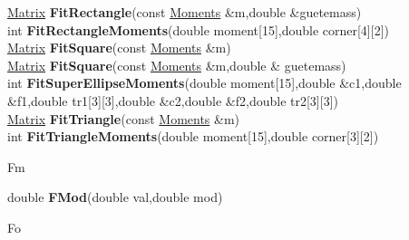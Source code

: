 \documentclass[10pt,titlepage]{article}
\def\functionlistentry#1#2#3#4#5#6{\noindent #1 {\bf #2}(#3) \dotfill #6\\}
\def\letterref#1{}
\def\letterlabel#1{\vspace{0.5cm}\centerline{\Large #1}}
\def\letterlabelend#1{}
\begin{document}
{{\functionlistentry{\hyperlink{Matrix}{Matrix}}{FitRectangle}{const \hyperlink{Moments}{Moments} \&m,double \&guetemass}{848}{moments}{}
\functionlistentry{int}{FitRectangleMoments}{double moment[15],double corner[4][2]}{1623}{obsolet}{}
\functionlistentry{\hyperlink{Matrix}{Matrix}}{FitSquare}{const \hyperlink{Moments}{Moments} \&m}{845}{moments}{}
\functionlistentry{\hyperlink{Matrix}{Matrix}}{FitSquare}{const \hyperlink{Moments}{Moments} \&m,double \& guetemass}{846}{moments}{}
\functionlistentry{int}{FitSuperEllipseMoments}{double moment[15],double \&c1,double \&f1,double tr1[3][3],double \&c2,double \&f2,double tr2[3][3]}{1631}{obsolet}{}
\functionlistentry{\hyperlink{Matrix}{Matrix}}{FitTriangle}{const \hyperlink{Moments}{Moments} \&m}{840}{moments}{}
\functionlistentry{int}{FitTriangleMoments}{double moment[15],double corner[3][2]}{1622}{obsolet}{}

\letterlabel{Fm}
\letterref{A}
\letterref{B}
\letterref{C}
\letterref{D}
\letterref{E}
\letterref{F}
\letterref{G}
\letterref{H}
\letterref{I}
\letterref{K}
\letterref{L}
\letterref{M}
\letterref{N}
\letterref{O}
\letterref{P}
\letterref{Q}
\letterref{R}
\letterref{S}
\letterref{T}
\letterref{U}
\letterref{V}
\letterref{W}
\letterref{X}
\letterref{Y}
\letterref{Z}

\letterref{Fe}
\letterref{Fi}
\letterref{Fm}
\letterref{Fo}
\letterref{Fr}
\letterref{Fu}
\letterlabelend{Fm}
\functionlistentry{double}{FMod}{double val,double mod}{1358}{numeric}{}

\letterlabel{Fo}
\letterref{A}
\letterref{B}
\letterref{C}
\letterref{D}
\letterref{E}
\letterref{F}
\letterref{G}
\letterref{H}
\letterref{I}
\letterref{K}
\letterref{L}
\letterref{M}
\letterref{N}
\letterref{O}
\letterref{P}
\letterref{Q}
\letterref{R}
\letterref{S}
\letterref{T}
\letterref{U}
\letterref{V}
\letterref{W}
\letterref{X}
\letterref{Y}
\letterref{Z}

}}
\end{document}
